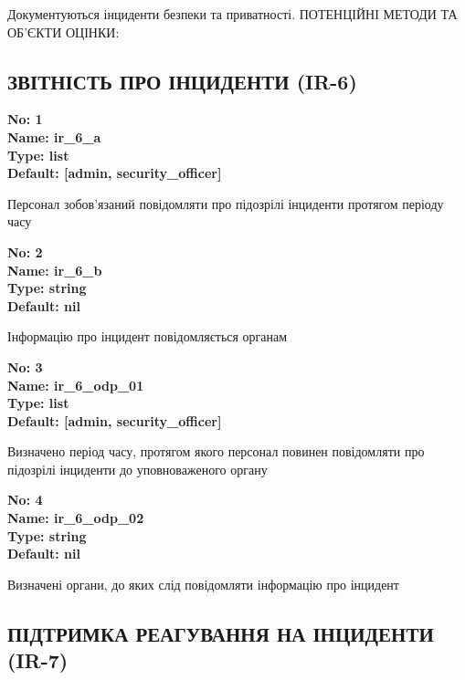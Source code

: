 \documentclass{article}
\begin{document}
{\footnotesize Документуються інциденти безпеки та приватності. ПОТЕНЦІЙНІ МЕТОДИ ТА ОБ'ЄКТИ ОЦІНКИ:}




\subsection{ЗВІТНІСТЬ ПРО ІНЦИДЕНТИ (IR-6)}


\vspace{10pt}
{\footnotesize\bfseries
No: 1\\
Name: ir\_\allowbreak{}6\_\allowbreak{}a\\
Type: list\\
Default: [\textquotedbl{}admin\textquotedbl{}, \textquotedbl{}security\_\allowbreak{}officer\textquotedbl{}]
}

{\footnotesize Персонал зобов'язаний повідомляти про підозрілі інциденти протягом періоду часу}


{\footnotesize\bfseries
No: 2\\
Name: ir\_\allowbreak{}6\_\allowbreak{}b\\
Type: string\\
Default: nil
}

{\footnotesize Інформацію про інцидент повідомляється органам}


{\footnotesize\bfseries
No: 3\\
Name: ir\_\allowbreak{}6\_\allowbreak{}odp\_\allowbreak{}01\\
Type: list\\
Default: [\textquotedbl{}admin\textquotedbl{}, \textquotedbl{}security\_\allowbreak{}officer\textquotedbl{}]
}

{\footnotesize Визначено період часу, протягом якого персонал повинен повідомляти про підозрілі інциденти до уповноваженого органу}


{\footnotesize\bfseries
No: 4\\
Name: ir\_\allowbreak{}6\_\allowbreak{}odp\_\allowbreak{}02\\
Type: string\\
Default: nil
}

{\footnotesize Визначені органи, до яких слід повідомляти інформацію про інцидент}




\subsection{ПІДТРИМКА РЕАГУВАННЯ НА ІНЦИДЕНТИ (IR-7)}
\end{document}
